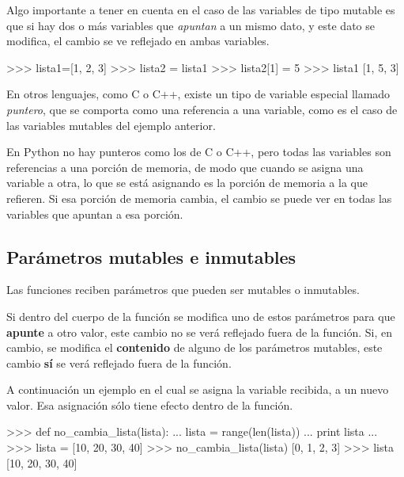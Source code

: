 Algo importante a tener en cuenta en el caso de las variables de tipo
mutable es que si hay dos o más variables que \textit{apuntan} a un mismo
dato, y este dato se modifica, el cambio se ve reflejado en ambas variables.

\begin{codigo-python-sn}
>>> lista1=[1, 2, 3]
>>> lista2 = lista1
>>> lista2[1] = 5
>>> lista1
[1, 5, 3]
\end{codigo-python-sn}

\begin{sabias_que}
En otros lenguajes, como C o C++, existe un tipo de variable especial
llamado {\it puntero}, que se comporta como una referencia a una variable,
como es el caso de las variables mutables del ejemplo anterior.

En Python no hay punteros como los de C o C++, pero todas las variables son
referencias a una porción de memoria, de modo que cuando se asigna una
variable a otra, lo que se está asignando es la porción de memoria a la que
refieren.  Si esa porción de memoria cambia, el cambio se puede ver en
todas las variables que apuntan a esa porción.
\end{sabias_que}


\subsection{Parámetros mutables e inmutables}

Las funciones reciben parámetros que pueden ser mutables o inmutables.

Si dentro del cuerpo de la función se modifica uno de estos parámetros para
que \textbf{apunte} a otro valor, este cambio no se verá reflejado fuera de la
función.  Si, en cambio, se modifica el \textbf{contenido} de alguno de los
parámetros mutables, este cambio \textbf{sí} se verá reflejado fuera de la
función.

A continuación un ejemplo en el cual se asigna la variable recibida, a un
nuevo valor.  Esa asignación sólo tiene efecto dentro de la función.

\begin{codigo-python-sn}
>>> def no_cambia_lista(lista):
...     lista = range(len(lista))
...     print lista
...
>>> lista = [10, 20, 30, 40]
>>> no_cambia_lista(lista)
[0, 1, 2, 3]
>>> lista
[10, 20, 30, 40]
\end{codigo-python-sn}

